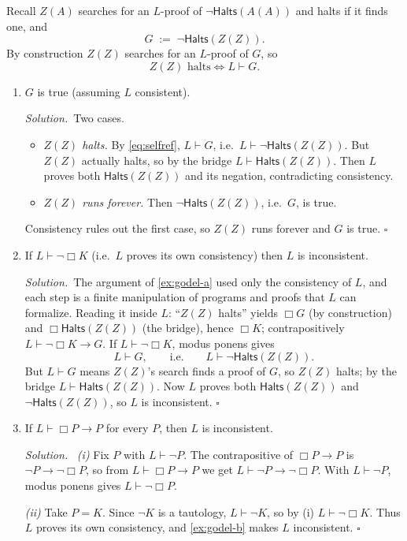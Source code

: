 \documentclass[11pt]{article}
\newcommand{\proves}{\vdash}
\newcommand{\Halts}{\mathsf{Halts}}
\newcommand{\bx}{\Box}
\newcommand{\soln}{\medskip\noindent\textit{Solution.}\ }
\renewcommand{\qed}{\ensuremath{\square}}
\begin{document}
\begin{solution}[ex:godel]
Recall $Z(A)$ searches for an $L$-proof of $\neg\Halts(A(A))$ and halts if it finds one, and
\[
  G \;:=\; \neg\Halts(Z(Z)).
\]
By construction $Z(Z)$ searches for an $L$-proof of $G$, so
\begin{equation}\label{eq:selfref}
  Z(Z)\text{ halts} \iff L\proves G. \tag{$\star$}
\end{equation}

\begin{enumerate}
\item $G$ is true (assuming $L$ consistent).

\soln Two cases.
\begin{itemize}[leftmargin=1.5em]
\item \emph{$Z(Z)$ halts.} By \eqref{eq:selfref}, $L\proves G$, i.e.\ $L\proves\neg\Halts(Z(Z))$. But $Z(Z)$ actually halts, so by the bridge $L\proves\Halts(Z(Z))$. Then $L$ proves both $\Halts(Z(Z))$ and its negation, contradicting consistency.
\item \emph{$Z(Z)$ runs forever.} Then $\neg\Halts(Z(Z))$, i.e.\ $G$, is true.
\end{itemize}
Consistency rules out the first case, so $Z(Z)$ runs forever and $G$ is true. \qed

\item If $L\proves\neg\bx K$ (i.e.\ $L$ proves its own consistency) then $L$ is inconsistent.

\soln The argument of \cref{ex:godel-a} used only the consistency of $L$, and each step is a finite manipulation of programs and proofs that $L$ can formalize. Reading it inside $L$: ``$Z(Z)$ halts'' yields $\bx G$ (by construction) and $\bx\Halts(Z(Z))$ (the bridge), hence $\bx K$; contrapositively $L\proves \neg\bx K \to G$. If $L\proves\neg\bx K$, modus ponens gives
\[
  L\proves G,\qquad\text{i.e.}\qquad L\proves\neg\Halts(Z(Z)).
\]
But $L\proves G$ means $Z(Z)$'s search finds a proof of $G$, so $Z(Z)$ halts; by the bridge $L\proves\Halts(Z(Z))$. Now $L$ proves both $\Halts(Z(Z))$ and $\neg\Halts(Z(Z))$, so $L$ is inconsistent. \qed

\item If $L\proves \bx P\to P$ for every $P$, then $L$ is inconsistent.

\soln
\emph{(i)} Fix $P$ with $L\proves\neg P$. The contrapositive of $\bx P\to P$ is $\neg P\to\neg\bx P$, so from $L\proves\bx P\to P$ we get $L\proves\neg P\to\neg\bx P$. With $L\proves\neg P$, modus ponens gives $L\proves\neg\bx P$.

\emph{(ii)} Take $P=K$. Since $\neg K$ is a tautology, $L\proves\neg K$, so by (i) $L\proves\neg\bx K$. Thus $L$ proves its own consistency, and \cref{ex:godel-b} makes $L$ inconsistent. \qed
\end{enumerate}
\end{solution}
\end{document}
